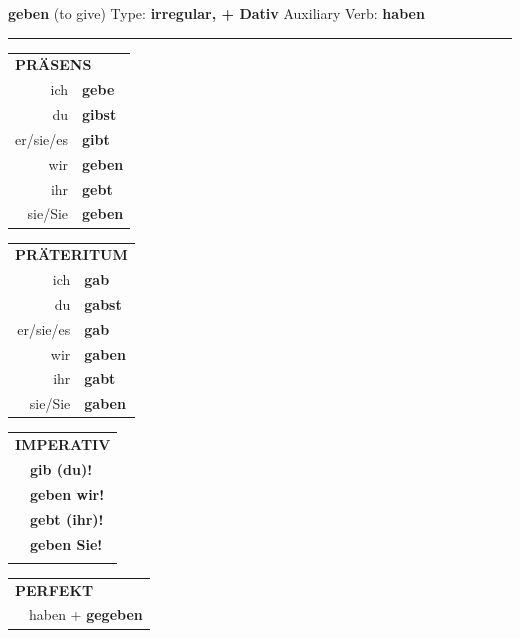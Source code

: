 \documentclass[10pt,a4paper]{revtex4-2}
\begin{document}
\begin{verbbox-dat}
    {\Large \bf geben} (to give) \hfill Type: \textbf{irregular, + Dativ} \hfill Auxiliary Verb: \textbf{haben} 
    
     \vspace{5pt}

    \hrule
    
    \vspace{5pt}

  \begin{tabular}{rl}
     \multicolumn{2}{l}{\textbf{PRÄSENS} }\\
    ich & \textbf{gebe}\\
    du & \textbf{gibst}\\
    er/sie/es & \textbf{gibt}\\
    wir & \textbf{geben}\\
    ihr & \textbf{gebt}\\
    sie/Sie & \textbf{geben}\\
  \end{tabular}
  \hfill
     \begin{tabular}{rl}
    \multicolumn{2}{l}{\textbf{PRÄTERITUM} }\\
    ich & \textbf{gab}\\
    du & \textbf{gabst}\\
    er/sie/es & \textbf{gab}\\
    wir & \textbf{gaben}\\
    ihr & \textbf{gabt}\\
    sie/Sie & \textbf{gaben}\\
  \end{tabular}
  \hfill
  \begin{tabular}{rl}
     \multicolumn{2}{l}{\textbf{IMPERATIV} }\\
   & \textbf{gib (du)!}\\
   & \textbf{geben wir!}\\
   & \textbf{gebt (ihr)!}\\
   & \textbf{geben Sie!}\\
   & \vspace{10pt}
  \end{tabular}

    \vspace{10pt}

 \begin{tabular}{rl}
     \multicolumn{2}{l}{\textbf{PERFEKT}}\\
   & haben + \textbf{gegeben}\\
  \end{tabular}
\hfill
   \begin{tabular}{rl}
   

\end{tabular}
\end{verbbox-dat}
\end{document}
